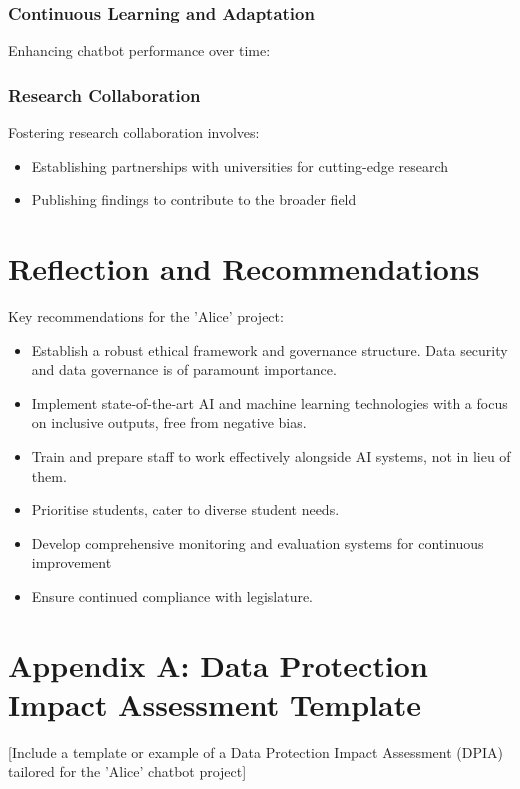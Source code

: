 \documentclass[14pt,a4paper]{article}
\begin{document}
\begin{multicols}{2}
\subsubsection{Continuous Learning and Adaptation}
Enhancing chatbot performance over time:

\subsubsection*{Research Collaboration}
Fostering research collaboration \textit{\parencite[pp. 50-100]{Dillenbourg2023}} involves:
\begin{itemize}
    \item Establishing partnerships with universities for cutting-edge research
    \item Publishing findings to contribute to the broader field
\end{itemize}

\newpage
\section{Reflection and Recommendations}

Key recommendations for the 'Alice' project:
\begin{itemize}
  \item Establish a robust ethical framework and governance structure. Data security and data governance is of paramount importance.
  \item Implement state-of-the-art AI and machine learning technologies with a focus on inclusive outputs, free from negative bias.
  \item Train and prepare staff to work effectively alongside AI systems, not in lieu of them.
  \item Prioritise students, cater to diverse student needs.
  \item Develop comprehensive monitoring and evaluation systems for continuous improvement
  \item Ensure continued compliance with legislature.
\end{itemize}



\end{multicols}

\newpage
\appendix
\section{Appendix A: Data Protection Impact Assessment Template}\label{appendix:a}
[Include a template or example of a Data Protection Impact Assessment (DPIA) tailored for the 'Alice' chatbot project]
\end{document}

